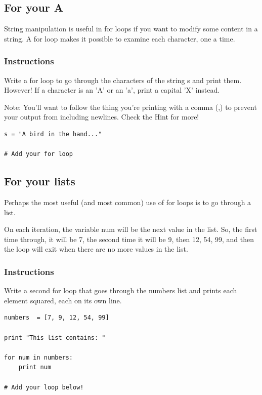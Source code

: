 \documentclass[12pt,a4paper,final,twoside,onecolumn,titlepage]{book}
\begin{document}
\subsection{For your A}

String manipulation is useful in for loops if you want to modify some content in a string. A for loop makes it possible to examine each character, one a time.
\subsubsection{Instructions}

Write a for loop to go through the characters of the string s and print them. However! If a character is an 'A' or an 'a', print a capital 'X' instead.

Note: You'll want to follow the thing you're printing with a comma (,) to prevent your output from including newlines. Check the Hint for more!
\begin{lstlisting}
s = "A bird in the hand..."

# Add your for loop

\end{lstlisting}

\subsection{For your lists}

Perhaps the most useful (and most common) use of for loops is to go through a list.

On each iteration, the variable num will be the next value in the list. So, the first time through, it will be 7, the second time it will be 9, then 12, 54, 99, and then the loop will exit when there are no more values in the list.
\subsubsection{Instructions}

Write a second for loop that goes through the numbers list and prints each element squared, each on its own line.

\begin{lstlisting}
numbers  = [7, 9, 12, 54, 99]

print "This list contains: "

for num in numbers:
    print num

# Add your loop below!
\end{lstlisting}
\end{document}
